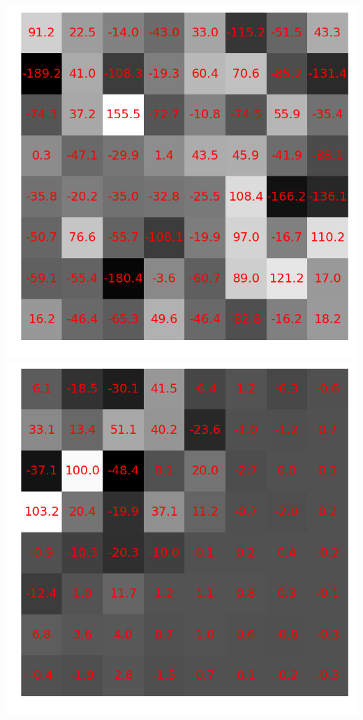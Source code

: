 \documentclass{beamer}
\begin{document}
\begin{frame}
\begin{center}
        \includegraphics[scale=0.12]{fig/8x8random_dct0.png}
        \hspace{0.5cm}
        \includegraphics[scale=0.12]{fig/8x8random_dct1.png}

\end{center}
\end{frame}
\end{document}

